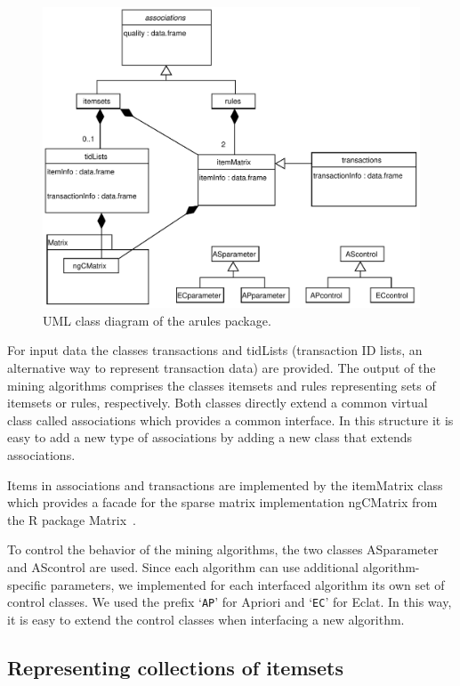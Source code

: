 \documentclass[10pt,a4paper]{article}
\newcommand{\strong}[1]{{\normalfont\fontseries{b}\selectfont #1}}
\newcommand{\class}[1]{\mbox{\textsf{#1}}}
\newcommand{\pkg}[1]{\strong{#1}}
\newcommand{\samp}[1]{`\mbox{\texttt{#1}}'}
\newcommand{\proglang}[1]{\textsf{#1}}
\begin{document}
\begin{figure}[tp]
\centering
\includegraphics[width=12cm]{arules-classes}
\caption{UML class diagram \citep[see][]{misc:Fowler:2004} of the \pkg{arules}
package.\label{fig:arules-classes}}
\end{figure}

For input data the classes \class{transactions} and \class{tidLists}
(transaction ID lists, an alternative way to represent transaction data)
are provided.  The output of the mining algorithms comprises the classes
\class{itemsets} and \class{rules} representing sets of itemsets or
rules, respectively.  Both classes directly extend a common virtual
class called \class{associations} which provides a common interface.  In
this structure it is easy to add a new type of associations by adding a
new class that extends \class{associations}.

Items in \class{associations} and \class{transactions} are implemented
by the \class{itemMatrix} class which provides a facade for the sparse
matrix implementation \class{ngCMatrix} from the \proglang{R} package
\pkg{Matrix}~\citep{arules:Bates+Maechler:2005}.

To control the behavior of the mining algorithms, the two classes
\class{ASparameter} and \class{AScontrol} are used.  Since each
algorithm can use additional algorithm-specific parameters, we
implemented for each interfaced algorithm its own set of control
classes.  We used the prefix \samp{AP} for Apriori and \samp{EC} for
Eclat.  In this way, it is easy to extend the control classes when
interfacing a new algorithm.


\subsection{Representing collections of itemsets\label{sec:setrepresentation}}
\end{document}
